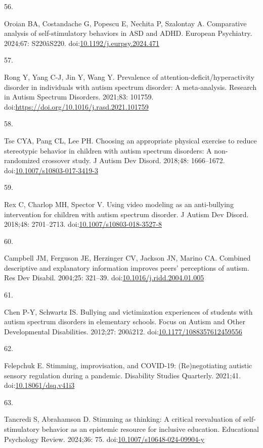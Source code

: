 \documentclass[
  letterpaper,
  DIV=11,
  numbers=noendperiod]{scrartcl}
\newlength{\cslhangindent}
\newlength{\csllabelwidth}
\newenvironment{CSLReferences}[2] %
 {\begin{list}{}{%
  \setlength{\itemindent}{0pt}
  \setlength{\leftmargin}{0pt}
  \setlength{\parsep}{0pt}
  \ifodd #1
   \setlength{\leftmargin}{\cslhangindent}
   \setlength{\itemindent}{-1\cslhangindent}
  \fi
  \setlength{\itemsep}{#2\baselineskip}}}
 {\end{list}}
\newcommand{\CSLLeftMargin}[1]{\parbox[t]{\csllabelwidth}{\strut#1\strut}}
\newcommand{\CSLRightInline}[1]{\parbox[t]{\linewidth - \csllabelwidth}{\strut#1\strut}}
\begin{document}
\begin{CSLReferences}{0}{1}
\CSLLeftMargin{56. }%
\CSLRightInline{Oroian BA, Costandache G, Popescu E, Nechita P,
Szalontay A. Comparative analysis of self-stimulatory behaviors in ASD
and ADHD. European Psychiatry. 2024;67: S220âS220.
doi:\href{https://doi.org/10.1192/j.eurpsy.2024.471}{10.1192/j.eurpsy.2024.471}}

\CSLLeftMargin{57. }%
\CSLRightInline{Rong Y, Yang C-J, Jin Y, Wang Y. Prevalence of
attention-deficit/hyperactivity disorder in individuals with autism
spectrum disorder: A meta-analysis. Research in Autism Spectrum
Disorders. 2021;83: 101759.
doi:\url{https://doi.org/10.1016/j.rasd.2021.101759}}

\CSLLeftMargin{58. }%
\CSLRightInline{Tse CYA, Pang CL, Lee PH. Choosing an appropriate
physical exercise to reduce stereotypic behavior in children with autism
spectrum disorders: A non-randomized crossover study. J Autism Dev
Disord. 2018;48: 1666--1672.
doi:\href{https://doi.org/10.1007/s10803-017-3419-3}{10.1007/s10803-017-3419-3}}

\CSLLeftMargin{59. }%
\CSLRightInline{Rex C, Charlop MH, Spector V. Using video modeling as an
anti-bullying intervention for children with autism spectrum disorder. J
Autism Dev Disord. 2018;48: 2701--2713.
doi:\href{https://doi.org/10.1007/s10803-018-3527-8}{10.1007/s10803-018-3527-8}}

\CSLLeftMargin{60. }%
\CSLRightInline{Campbell JM, Ferguson JE, Herzinger CV, Jackson JN,
Marino CA. Combined descriptive and explanatory information improves
peers' perceptions of autism. Res Dev Disabil. 2004;25: 321--39.
doi:\href{https://doi.org/10.1016/j.ridd.2004.01.005}{10.1016/j.ridd.2004.01.005}}

\CSLLeftMargin{61. }%
\CSLRightInline{Chen P-Y, Schwartz IS. Bullying and victimization
experiences of students with autism spectrum disorders in elementary
schools. Focus on Autism and Other Developmental Disabilities. 2012;27:
200â212.
doi:\href{https://doi.org/10.1177/1088357612459556}{10.1177/1088357612459556}}

\CSLLeftMargin{62. }%
\CSLRightInline{Felepchuk E. Stimming, improvisation, and COVID-19:
(Re)negotiating autistic sensory regulation during a pandemic.
Disability Studies Quarterly. 2021;41.
doi:\href{https://doi.org/10.18061/dsq.v41i3}{10.18061/dsq.v41i3}}

\CSLLeftMargin{63. }%
\CSLRightInline{Tancredi S, Abrahamson D. Stimming as thinking: A
critical reevaluation of self-stimulatory behavior as an epistemic
resource for inclusive education. Educational Psychology Review.
2024;36: 75.
doi:\href{https://doi.org/10.1007/s10648-024-09904-y}{10.1007/s10648-024-09904-y}}

\end{CSLReferences}
\end{document}
